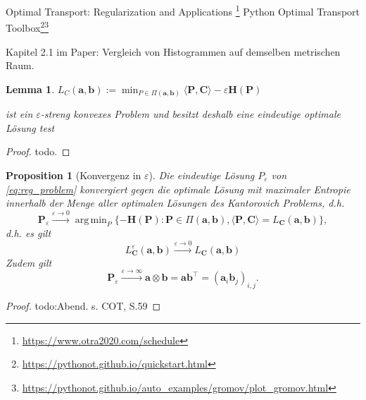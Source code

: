 \documentclass[twoside, 11pt,a4paper]{article}
\DeclareMathOperator*{\argmin}{arg\,min}
\newtheorem{lemma}[theorem]{Lemma}
\newtheorem{proposition}[theorem]{Proposition}
\numberwithin{equation}{section}
\begin{document}
	Optimal Transport: Regularization and Applications
	\footnote{\url{https://www.otra2020.com/schedule}}
	Python Optimal Transport Toolbox\footnote{\url{https://pythonot.github.io/quickstart.html}}\footnote{\url{https://pythonot.github.io/auto_examples/gromov/plot_gromov.html}}
	
	Kapitel 2.1 im Paper: Vergleich von Histogrammen auf demselben metrischen Raum.
	
	\begin{lemma}
		$L_C(\boldsymbol{a}, \boldsymbol{b}):= \min_{P \in \Pi(\boldsymbol{a}, \boldsymbol{b})} \langle \boldsymbol{P}, \boldsymbol{C} \rangle - \varepsilon \boldsymbol{H}(\boldsymbol{P})$\label{eq:reg_problem}
		
		ist ein $\varepsilon$-streng konvexes Problem und besitzt deshalb eine eindeutige optimale Lösung
		test
	\end{lemma}
	
	\begin{proof}
		todo.
	\end{proof}
	
	\begin{proposition}[Konvergenz in $\varepsilon$]
		Die eindeutige Lösung $P_\varepsilon$ von \autoref{eq:reg_problem} konvergiert gegen die optimale Lösung mit maximaler Entropie innerhalb der Menge aller optimalen Lösungen des Kantorovich Problems, d.h.
		\begin{equation}
		\boldsymbol{P}_\varepsilon \xrightarrow{\varepsilon \to 0} \argmin_{P} \lbrace -\boldsymbol{H}(\boldsymbol{P}) : \boldsymbol{P} \in \Pi (\boldsymbol{a}, \boldsymbol{b}), \langle \boldsymbol{P}, \boldsymbol{C} \rangle = L_{\boldsymbol{C}}(\boldsymbol{a}, \boldsymbol{b}) \rbrace, \label{eq:P_eps_0}
		\end{equation}
		d.h. es gilt
		\begin{equation}
		L_{\boldsymbol{C}}^\varepsilon (\boldsymbol{a}, \boldsymbol{b}) \xrightarrow{\varepsilon \to 0} L_{\boldsymbol{C}}(\boldsymbol{a}, \boldsymbol{b})
		\end{equation}
		Zudem gilt
		\begin{equation}
		\boldsymbol{P}_\varepsilon \xrightarrow{\varepsilon \to \infty} \boldsymbol{a} \otimes \boldsymbol{b} = \boldsymbol{a} \boldsymbol{b}^\top = (\boldsymbol{a}_i \boldsymbol{b}_j)_{i,j}. \label{eq:P_eps_infty}
		\end{equation}
	\end{proposition}
	
	\begin{proof}
		todo:Abend. s. COT, S.59
	\end{proof}
	
\end{document}
